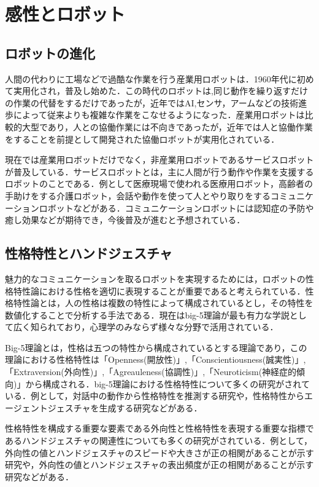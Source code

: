 \section{感性とロボット}
\label{sec2.3}

\subsection{ロボットの進化}
\label{sec2.3.1}
人間の代わりに工場などで過酷な作業を行う産業用ロボットは．1960年代に初めて実用化され，普及し始めた．この時代のロボットは,同じ動作を繰り返すだけの作業の代替をするだけであったが，近年ではAI,センサ，アームなどの技術進歩によって従来よりも複雑な作業をこなせるようになった．産業用ロボットは比較的大型であり，人との協働作業には不向きであったが，近年では人と協働作業をすることを前提として開発された協働ロボットが実用化されている．

現在では産業用ロボットだけでなく，非産業用ロボットであるサービスロボットが普及している．サービスロボットとは，主に人間が行う動作や作業を支援するロボットのことである．例として医療現場で使われる医療用ロボット，高齢者の手助けをする介護ロボット，会話や動作を使って人とやり取りをするコミュニケーションロボットなどがある．コミュニケーションロボットには認知症の予防や癒し効果などが期待でき，今後普及が進むと予想されている．


\subsection{性格特性とハンドジェスチャ}
\label{sec2.3.2}
魅力的なコミュニケーションを取るロボットを実現するためには，ロボットの性格特性論における性格を適切に表現することが重要であると考えられている\cite{ロボットの性格特性1}\cite{ロボットの性格特性2}\cite{ロボットの性格特性3}．性格特性論とは，人の性格は複数の特性によって構成されているとし，その特性を数値化することで分析する手法である．現在はbig-5理論が最も有力な学説として広く知られており，心理学のみならず様々な分野で活用されている．

Big-5理論とは，性格は五つの特性から構成されているとする理論であり，この理論における性格特性は「Openness(開放性)」,「Conscientiousness(誠実性)」,「Extraversion(外向性)」,「Agreauleness(協調性)」,「Neuroticism(神経症的傾向)」から構成される．big-5理論における性格特性について多くの研究がされている．例として，対話中の動作から性格特性を推測する研究や，性格特性からエージェントジェスチャを生成する研究などがある\cite{性格特性推測}\cite{ジェスチャ生成}．

性格特性を構成する重要な要素である外向性と性格特性を表現する重要な指標であるハンドジェスチャの関連性についても多くの研究がされている\cite{ハンドジェスチャ指標1}\cite{ハンドジェスチャ指標2}\cite{ハンドジェスチャ指標3}．例として，外向性の値とハンドジェスチャのスピードや大きさが正の相関があることが示す研究や，外向性の値とハンドジェスチャの表出頻度が正の相関があることが示す研究などがある\cite{ジェスチャ生成}\cite{ハンドジェスチャ指標1}\cite{ハンドジェスチャ指標3}\cite{ハンドジェスチャ外向性}．






\vspace{1cm}
\begin{figure}[!h]
 \begin{center}
  \centering
  \label{fig:kansei}
 \end{center}
\end{figure}

